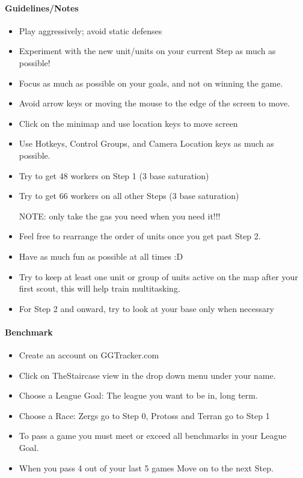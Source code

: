 \documentclass{article}
\begin{document}
\paragraph{Guidelines/Notes}
\begin{itemize}
    \item Play aggressively; avoid static defenses
    \item Experiment with the new unit/units on your current Step as much as
        possible!
    \item Focus as much as possible on your goals, and not on winning the game.
    \item Avoid arrow keys or moving the mouse to the edge of the screen to
        move.
    \item Click on the minimap and use location keys to move screen
    \item Use Hotkeys, Control Groups, and Camera Location keys as much as
        possible.
    \item Try to get 48 workers on Step 1 (3 base saturation)
    \item Try to get 66 workers on all other Steps (3 base saturation)
    
        NOTE: only take the gas you need when you need it!!!
    \item Feel free to rearrange the order of units once you get past Step 2.
    \item Have as much fun as possible at all times  :D
    \item Try to keep at least one unit or group of units active on the map
        after your first scout, this will help train multitasking.
    \item For Step 2 and onward, try to look at your base only when necessary
\end{itemize}

\paragraph{Benchmark}
\begin{itemize}
    \item Create an account on GGTracker.com
    \item Click on TheStaircase view in the drop down menu under your name.
    \item Choose a League Goal: The league you want to be in, long term.
    \item Choose a Race: Zergs go to Step 0, Protoss and Terran go to Step 1
    \item To pass a game you must meet or exceed all benchmarks in your League 
        Goal.
    \item When you pass 4 out of your last 5 games Move on to the next Step.
\end{itemize}
\end{document}
